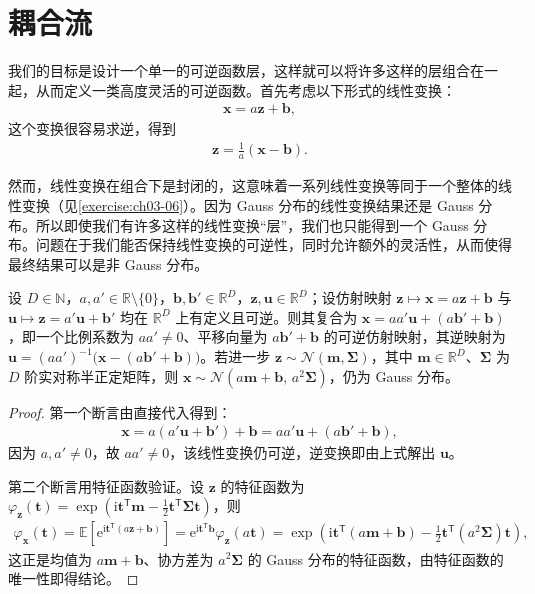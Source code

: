 \documentclass[../../main.tex]{subfiles}
\begin{document}
\section{耦合流}\label{section:ch18-耦合流}

我们的目标是设计一个单一的可逆函数层，这样就可以将许多这样的层组合在一起，从而定义一类高度灵活的可逆函数。首先考虑以下形式的线性变换：
\begin{align}
  \bm{x}=a\bm{z}+\bm{b},\label{align:ch18-线性变换}
\end{align}
这个变换很容易求逆，得到
\begin{align}
  \bm{z}=\frac{1}{a}(\bm{x}-\bm{b}).\label{align:ch18-线性逆}
\end{align}

然而，线性变换在组合下是封闭的，这意味着一系列线性变换等同于一个整体的线性变换（见\cref{exercise:ch03-06}）。因为 Gauss 分布的线性变换结果还是 Gauss 分布。所以即使我们有许多这样的线性变换“层”，我们也只能得到一个 Gauss 分布。问题在于我们能否保持线性变换的可逆性，同时允许额外的灵活性，从而使得最终结果可以是非 Gauss 分布。

\begin{proposition}[线性层的复合]\label{proposition:ch18-线性层复合}
设 $D\in\mathbb{N}$，$a,a'\in\mathbb{R}\setminus\{0\}$，$\bm{b},\bm{b}'\in\mathbb{R}^{D}$，$\bm{z},\bm{u}\in\mathbb{R}^{D}$；设仿射映射 $\bm{z}\mapsto\bm{x}=a\bm{z}+\bm{b}$ 与 $\bm{u}\mapsto\bm{z}=a'\bm{u}+\bm{b}'$ 均在 $\mathbb{R}^{D}$ 上有定义且可逆。则其复合为 $\bm{x}=aa'\bm{u}+(a\bm{b}'+\bm{b})$，即一个比例系数为 $aa'\neq0$、平移向量为 $a\bm{b}'+\bm{b}$ 的可逆仿射映射，其逆映射为 $\bm{u}=(aa')^{-1}\big(\bm{x}-(a\bm{b}'+\bm{b})\big)$。若进一步 $\bm{z}\sim\mathcal{N}(\bm{m},\bm{\Sigma})$，其中 $\bm{m}\in\mathbb{R}^{D}$、$\bm{\Sigma}$ 为 $D$ 阶实对称半正定矩阵，则 $\bm{x}\sim\mathcal{N}(a\bm{m}+\bm{b},\,a^{2}\bm{\Sigma})$，仍为 Gauss 分布。
\end{proposition}

\begin{proof}
第一个断言由直接代入得到：
\begin{align*}
  \bm{x}=a(a'\bm{u}+\bm{b}')+\bm{b}=aa'\bm{u}+(a\bm{b}'+\bm{b}),
\end{align*}
因为 $a,a'\neq0$，故 $aa'\neq0$，该线性变换仍可逆，逆变换即由上式解出 $\bm{u}$。

第二个断言用特征函数验证。设 $\bm{z}$ 的特征函数为 $\varphi_{\bm{z}}(\bm{t})=\exp\left(\mathrm{i}\bm{t}^{\mathsf T}\bm{m}-\tfrac{1}{2}\bm{t}^{\mathsf T}\bm{\Sigma}\bm{t}\right)$，则
\begin{align*}
  \varphi_{\bm{x}}(\bm{t})=\mathbb{E}\left[\mathrm{e}^{\mathrm{i}\bm{t}^{\mathsf T}(a\bm{z}+\bm{b})}\right]=\mathrm{e}^{\mathrm{i}\bm{t}^{\mathsf T}\bm{b}}\varphi_{\bm{z}}(a\bm{t})=\exp\left(\mathrm{i}\bm{t}^{\mathsf T}(a\bm{m}+\bm{b})-\tfrac{1}{2}\bm{t}^{\mathsf T}(a^{2}\bm{\Sigma})\bm{t}\right),
\end{align*}
这正是均值为 $a\bm{m}+\bm{b}$、协方差为 $a^{2}\bm{\Sigma}$ 的 Gauss 分布的特征函数，由特征函数的唯一性即得结论。
\end{proof}
\end{document}
